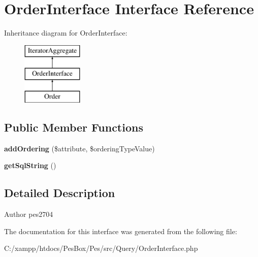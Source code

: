 \hypertarget{interface_pes_1_1_query_1_1_order_interface}{}\section{Order\+Interface Interface Reference}
\label{interface_pes_1_1_query_1_1_order_interface}
Inheritance diagram for Order\+Interface\+:\begin{figure}[H]
\begin{center}
\leavevmode
\includegraphics[height=3.000000cm]{interface_pes_1_1_query_1_1_order_interface}
\end{center}
\end{figure}
\subsection*{Public Member Functions}
\begin{DoxyCompactItemize}
\item 
\mbox{\label{interface_pes_1_1_query_1_1_order_interface_aa035bd6e54e77ff9182c581504da91f8}} 
{\bfseries add\+Ordering} (\$attribute, \$ordering\+Type\+Value)
\item 
\mbox{\label{interface_pes_1_1_query_1_1_order_interface_a60f88a13135803a03975ff6555ece43f}} 
{\bfseries get\+Sql\+String} ()
\end{DoxyCompactItemize}


\subsection{Detailed Description}
\begin{DoxyAuthor}{Author}
pes2704 
\end{DoxyAuthor}


The documentation for this interface was generated from the following file\+:\begin{DoxyCompactItemize}
\item 
C\+:/xampp/htdocs/\+Pes\+Box/\+Pes/src/\+Query/Order\+Interface.\+php\end{DoxyCompactItemize}
